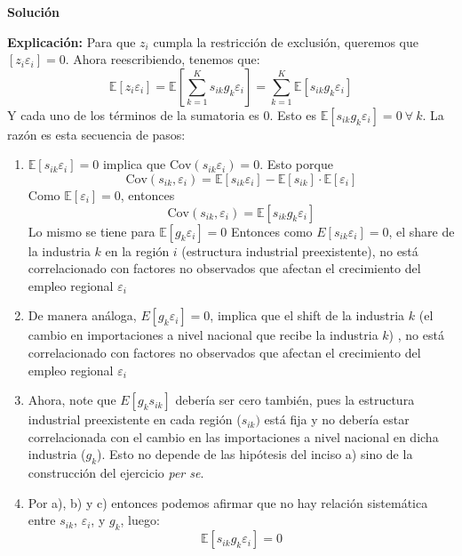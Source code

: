 \documentclass[a4paper, answers, addpoints, 11pt]{exam}
\newenvironment{solucion}{%
  \begin{mdframed}[
    backgroundcolor=blue!5,    %
    linecolor=blue!50,          %
    linewidth=2pt,              %
    leftmargin=10pt,            %
    rightmargin=8pt,           %
    topline=true,              %
    bottomline=true,            %
    roundcorner=10pt,           %
    innerleftmargin=10pt,       %
    innerrightmargin=10pt,      %
    innerbottommargin=10pt,     %
    innertopmargin=10pt         %
  ]%
  \begin{tcolorbox}[colframe=blue!50!black, colback=blue!50, coltitle=white, sharp corners=all, boxrule=1mm, width=\textwidth, halign=left, valign=center, top=0mm, bottom=0mm, left=0mm, right=0mm] \textbf{Solución} \end{tcolorbox} }{\end{mdframed}}
\begin{document}
\begin{enumerate}
\begin{itemize}
\begin{solucion}
        \textbf{Explicación:} Para que $z_i$ cumpla la restricción de exclusión, queremos que $[z_i \varepsilon_i]=0$. Ahora reescribiendo, tenemos que:
        \begin{equation}\label{exogeneidad3}
    \mathbb{E}[z_i \varepsilon_i] = \mathbb{E} \left[ \sum_{k=1}^K s_{ik} g_k \varepsilon_i \right] = \sum_{k=1}^K \mathbb{E}[s_{ik} g_k \varepsilon_i]
\end{equation}
Y cada uno de los términos de la sumatoria es 0. Esto es $\mathbb{E}[s_{ik} g_k \varepsilon_i]=0 \: \forall \:k.$ La razón es esta secuencia de pasos:
\begin{enumerate}
    \item $\mathbb{E}[s_{ik}  \varepsilon_i] = 0 $ implica que $ \text{Cov}(s_{ik}\varepsilon_i)=0$. Esto porque  \begin{equation*}\text{Cov}(s_{ik}, \varepsilon_i) =
\mathbb{E}[s_{ik} \varepsilon_i] - \mathbb{E}[s_{ik}] \cdot \mathbb{E}[\varepsilon_i]
\end{equation*}
Como  \( \mathbb{E}[\varepsilon_i] = 0 \), entonces 
 \begin{equation*}
        \text{Cov}(s_{ik},  \varepsilon_i) =
\mathbb{E}[s_{ik} g_k \varepsilon_i] 
\end{equation*}
Lo mismo se tiene para $\mathbb{E}[ g_k \varepsilon_i] =0$
     Entonces como $E[s_{ik}\varepsilon_i] = 0$, el share de la industria $k$ en la región $i$ (estructura industrial preexistente), no está correlacionado con  factores no observados que afectan el crecimiento del empleo regional $\varepsilon_i$ 
    \item De manera análoga, $E[g_{k}\varepsilon_i] = 0$, implica que el shift de la industria $k$ (el cambio en importaciones a nivel nacional que recibe la industria $k$) , no está correlacionado con  factores no observados que afectan el crecimiento del empleo regional $\varepsilon_i$ 
    \item Ahora,  note que $E[g_{k}s_{ik}]$ debería ser cero también, pues la estructura industrial preexistente en cada región ($s_{ik})$ está fija y no debería estar correlacionada con el cambio en las importaciones a nivel nacional en dicha industria ($g_{k}$). Esto no depende de las hipótesis del inciso a) sino de la construcción del ejercicio \textit{per se}.
    \item Por a), b) y c) entonces podemos afirmar que no hay relación sistemática entre \(s_{ik}\), \(\varepsilon_i\), y \(g_k\), luego:
    \[\mathbb{E}[s_{ik} g_k \varepsilon_i] =0  
\] 
\end{enumerate} 


\end{solucion}
\end{itemize}
\end{enumerate}
\end{document}
